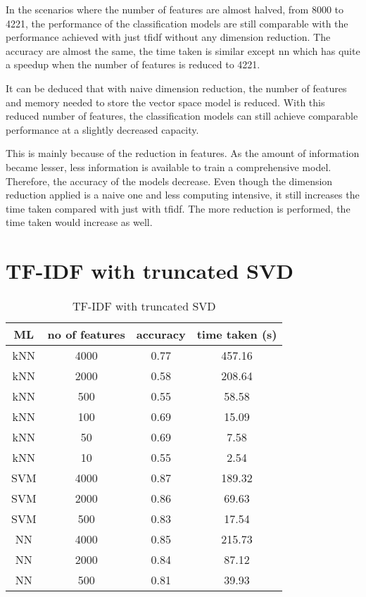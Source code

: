 In the scenarios where the number of features are almost halved, from 8000 to 4221, the performance of the classification models are still comparable with the performance achieved with just \ac{tfidf} without any dimension reduction. The accuracy are almost the same, the time taken is similar except \ac{nn} which has quite a speedup when the number of features is reduced to 4221.

It can be deduced that with naive dimension reduction, the number of features and memory needed to store the vector space model is reduced. With this reduced number of features, the classification models can still achieve comparable performance at a slightly decreased capacity.

This is mainly because of the reduction in features. As the amount of information became lesser, less information is available to train a comprehensive model. Therefore, the accuracy of the models decrease. Even though the dimension reduction applied is a naive one and less computing intensive, it still increases the time taken compared with just with \ac{tfidf}. The more reduction is performed, the time taken would increase as well.

\section{TF-IDF with truncated SVD}

\begin{table} [ht]
	\centering
	\begin{tabular}{|| c | c | c | c||}
		\hline
		ML & no of features & accuracy & time taken (s) \\ [0.5ex]
		\hline\hline
		kNN & 4000 & 0.77 & 457.16 \\
		\hline
		kNN & 2000 & 0.58 & 208.64 \\ 
		\hline
		kNN & 500 & 0.55 & 58.58 \\ 
		\hline
		kNN & 100 & 0.69 & 15.09 \\
		\hline
		kNN & 50 & 0.69 & 7.58 \\ 
		\hline
		kNN & 10 & 0.55 & 2.54 \\ 
		\hline\hline
		SVM & 4000 & 0.87 & 189.32 \\
		\hline
		SVM & 2000 & 0.86 & 69.63 \\
		\hline
		SVM & 500 & 0.83 & 17.54 \\
		\hline\hline
		NN & 4000 & 0.85 & 215.73 \\
		\hline
		NN & 2000 & 0.84 & 87.12 \\
		\hline
		NN & 500 & 0.81 & 39.93 \\
		\hline
	\end{tabular}
\caption{TF-IDF with truncated SVD}
\label{tbl:tfidfSvd}
\end{table}

